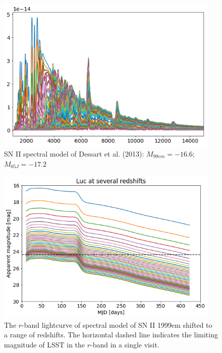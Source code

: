 \documentclass[12pt, onecolumn]{emulateapj}
\begin{document}
\begin{figure}
	\begin{center}
		\includegraphics[width=0.95\textwidth]{spectral_model_SNII.png}
		\caption{SN II spectral model of Dessart et al. (2013): $M_{99em}=-16.6$; $M_{05J}=-17.2$}
		\label{fig:SNII_lc}
	\end{center}
\end{figure}

\begin{figure}
	\begin{center}
		\includegraphics[width=0.95\textwidth]{SNII_lc_withz.png}
		\caption{The $r$-band lightcurve of spectral model of SN II 1999em shifted to a range of redshifts. The horizontal dashed line indicates the limiting magnitude of LSST in the $r$-band in a single visit.}
		\label{fig:SNII_lc_wz}
	\end{center}
\end{figure}
\end{document}
